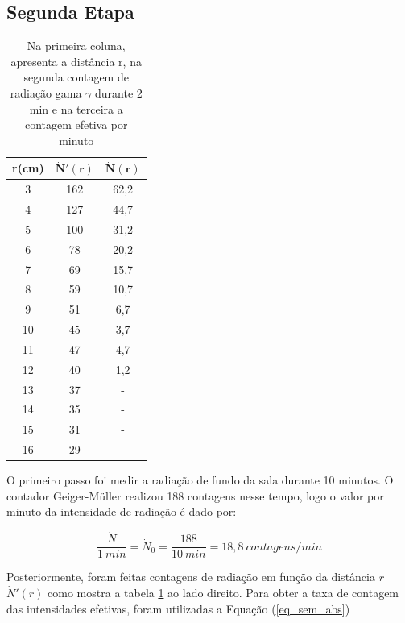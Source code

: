 \documentclass{article}
\begin{document}
\subsection{Segunda Etapa}

\begin{table}
    \centering
    \begin{tabular}{|c|c|c|}
    \hline
    \rowcolor{cinzaclaro}
\textbf{r(cm)} & {$\mathbf{\dot N'(r)}$} & {$\mathbf{\dot N(r)}$}  \\ \hline
3     & 162     & 62,2  \\ \hline 
4     & 127     & 44,7  \\ \hline 
5     & 100     & 31,2   \\ \hline 
6     & 78      & 20,2  \\ \hline 
7     & 69      & 15,7   \\ \hline 
8     & 59      & 10,7   \\ \hline 
9     & 51      & 6,7   \\ \hline
10     & 45     & 3,7   \\ \hline
11     & 47     & 4,7   \\ \hline
12     & 40     & 1,2   \\ \hline
13     & 37     & -   \\ \hline
14     & 35     & -   \\ \hline
15     & 31     & -   \\ \hline
16     & 29     & -    \\ \hline
    \end{tabular}
	\caption{Na primeira coluna, apresenta a distância r, na segunda contagem de radiação gama $\gamma$ durante 2 min e na terceira a contagem efetiva por minuto}
    \label{tabela_2min}
\end{table}

O primeiro passo foi medir a radiação de fundo da sala durante 10 minutos. O contador Geiger-Müller realizou 188 contagens nesse tempo, logo o valor por minuto da intensidade de radiação é dado por:

\begin{equation}
    \label{radiacaofundo}
    \frac{\dot N}{1 \ min} =\dot N _0 =\frac{188}{10 \ min} = 18,8 \ contagens/min
\end{equation}

Posteriormente, foram feitas contagens de radiação em função da distância $r$ $\dot N'(r)$ como mostra a tabela \ref{tabela_2min} ao lado direito. Para obter a taxa de contagem das intensidades efetivas, foram utilizadas a Equação (\ref{eq_sem_abs}) 
\end{document}
